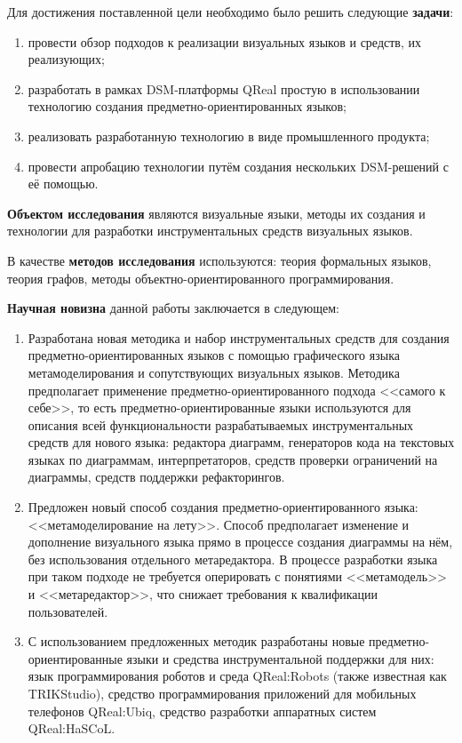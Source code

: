 Для достижения поставленной цели необходимо было решить следующие \textbf{задачи}:
\begin{enumerate}
	\item провести обзор подходов к реализации визуальных языков и средств, их реализующих;
	\item разработать в рамках \ac{DSM}-платформы QReal простую в использовании технологию создания предметно-ориентированных языков;
	\item реализовать разработанную технологию в виде промышленного продукта;
	\item провести апробацию технологии путём создания нескольких \ac{DSM}-решений с её помощью.
\end{enumerate}

\textbf{Объектом исследования} являются визуальные языки, методы их создания и технологии
для разработки инструментальных средств визуальных языков.

В качестве \textbf{методов исследования} используются: теория формальных языков, теория графов, 
методы объектно-ориентированного программирования.

\textbf{Научная новизна} данной работы заключается в следующем:
\begin{enumerate}
	\item Разработана новая методика и набор инструментальных средств для создания предметно-ориентированных 
		языков с помощью графического языка метамоделирования и сопутствующих визуальных языков.
		Методика предполагает применение предметно-ориентированного подхода <<самого к себе>>, то есть
		предметно-ориентированные языки используются для описания всей функциональности разрабатываемых
		инструментальных средств для нового языка: редактора диаграмм, генераторов кода на текстовых языках по 
		диаграммам, интерпретаторов, средств проверки ограничений на диаграммы, средств поддержки рефакторингов.
	\item Предложен новый способ создания предметно-ориентированного языка: <<метамоделирование на лету>>. 
		Способ предполагает изменение и дополнение визуального языка прямо в процессе создания диаграммы на нём,
		без использования отдельного метаредактора. В процессе разработки языка при таком подходе
		не требуется оперировать с понятиями <<метамодель>> и <<метаредактор>>, что снижает 
		требования к квалификации пользователей.
	\item С использованием предложенных методик разработаны новые предметно-ориентированные языки и
		средства инструментальной поддержки для них: язык программирования роботов и среда QReal:Robots
		(также известная как TRIKStudio), средство программирования приложений для мобильных телефонов 
		QReal:Ubiq, средство разработки аппаратных систем QReal:HaSCoL.
\end{enumerate}


